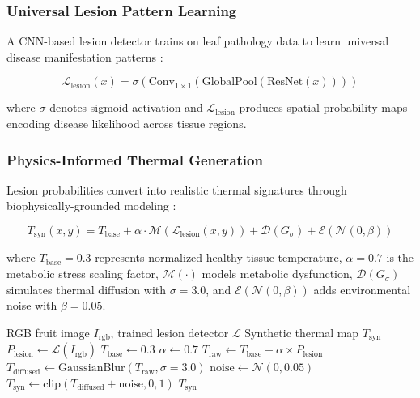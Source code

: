 \documentclass[conference]{IEEEtran}
\begin{document}
\subsubsection{Universal Lesion Pattern Learning}
A CNN-based lesion detector trains on leaf pathology data to learn universal disease manifestation patterns \cite{he2016}:

\begin{equation}
    \mathcal{L}_{\text{lesion}}(x) = \sigma(\text{Conv}_{1\times 1}(\text{GlobalPool}(\text{ResNet}(x))))
    \label{eq:lesion_detector}
\end{equation}

where $\sigma$ denotes sigmoid activation and $\mathcal{L}_{\text{lesion}}$ produces spatial probability maps encoding disease likelihood across tissue regions.

\subsubsection{Physics-Informed Thermal Generation}
Lesion probabilities convert into realistic thermal signatures through biophysically-grounded modeling \cite{raissi2019}:

\begin{equation}
    T_{\text{syn}}(x,y) = T_{\text{base}} + \alpha \cdot \mathcal{M}(\mathcal{L}_{\text{lesion}}(x,y)) + \mathcal{D}(G_{\sigma}) + \mathcal{E}(\mathcal{N}(0,\beta))
    \label{eq:thermal_synthesis}
\end{equation}

where $T_{\text{base}} = 0.3$ represents normalized healthy tissue temperature, $\alpha = 0.7$ is the metabolic stress scaling factor, $\mathcal{M}(\cdot)$ models metabolic dysfunction, $\mathcal{D}(G_{\sigma})$ simulates thermal diffusion with $\sigma = 3.0$, and $\mathcal{E}(\mathcal{N}(0,\beta))$ adds environmental noise with $\beta = 0.05$.

\begin{algorithm}[!t]
    \caption{Thermal Synthesis Pipeline}
    \label{alg:thermal}
    \begin{algorithmic}[1]
        \REQUIRE RGB fruit image $I_{\text{rgb}}$, trained lesion detector $\mathcal{L}$
        \ENSURE Synthetic thermal map $T_{\text{syn}}$
        \STATE $P_{\text{lesion}} \leftarrow \mathcal{L}(I_{\text{rgb}})$
        \STATE $T_{\text{base}} \leftarrow 0.3$
        \STATE $\alpha \leftarrow 0.7$
        \STATE $T_{\text{raw}} \leftarrow T_{\text{base}} + \alpha \times P_{\text{lesion}}$
        \STATE $T_{\text{diffused}} \leftarrow \text{GaussianBlur}(T_{\text{raw}}, \sigma=3.0)$
        \STATE $\text{noise} \leftarrow \mathcal{N}(0, 0.05)$
        \STATE $T_{\text{syn}} \leftarrow \text{clip}(T_{\text{diffused}} + \text{noise}, 0, 1)$
        \RETURN $T_{\text{syn}}$
    \end{algorithmic}
\end{algorithm}
\end{document}
